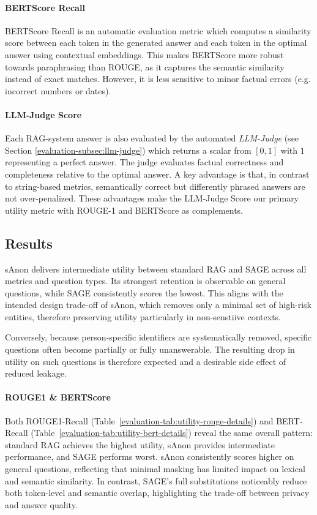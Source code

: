 \paragraph{BERTScore Recall} BERTScore Recall\cite{bertScore} is an automatic evaluation metric which computes a similarity score between each token in the generated answer and each token in the optimal answer using contextual embeddings. This makes BERTScore more robust towards paraphrasing than ROUGE, as it captures the semantic similarity instead of exact matches. However, it is less sensitive to minor factual errors (e.g. incorrect numbers or dates). 


\paragraph{LLM-Judge Score} Each {RAG}-system answer is also evaluated by the automated \textit{LLM-Judge} (see Section \ref{evaluation-subsec:llm-judge}) which returns a scalar from $[0,1]$ with $1$ representing a perfect answer. The judge evaluates factual correctness and completeness relative to the optimal answer. A key advantage is that, in contrast to string-based metrics, semantically correct but differently phrased answers are not over-penalized. These advantages make the LLM-Judge Score our primary utility metric with ROUGE-1 and BERTScore as complements.



\subsection{Results}
sAnon delivers intermediate utility between standard RAG and SAGE across all metrics and question types. Its strongest retention is observable on general questions, while SAGE consistently scores the lowest. This aligns with the intended design trade-off of sAnon, which removes only a minimal set of high-risk entities, therefore preserving utility particularly in non-senstiive contexts. 

Conversely, because person-specific identifiers are systematically removed, specific questions often become partially or fully unanswerable. The resulting drop in utility on such questions is therefore expected and a desirable side effect of reduced leakage.

\paragraph{ROUGE1 \& BERTScore}
Both ROUGE1-Recall (Table~\ref{evaluation-tab:utility-rouge-details}) and BERT-Recall (Table~\ref{evaluation-tab:utility-bert-details}) reveal the same overall pattern: standard RAG achieves the highest utility, sAnon provides intermediate performance, and SAGE performs worst. sAnon consistently scores higher on general questions, reflecting that minimal masking has limited impact on lexical and semantic similarity. In contrast, SAGE's full substitutions noticeably reduce both token-level and semantic overlap, highlighting the trade-off between privacy and answer quality.

